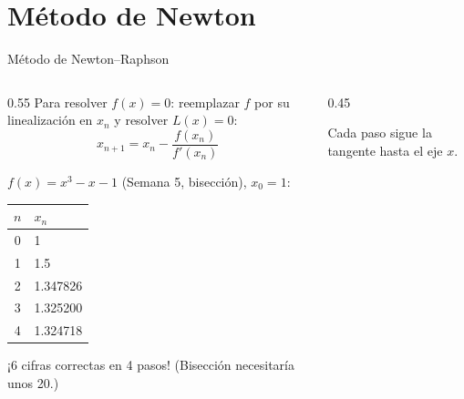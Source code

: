 \documentclass[10pt,aspectratio=169]{beamer}
\begin{document}
\section{Método de Newton}

\begin{frame}{Método de Newton--Raphson}
  \begin{columns}
    \begin{column}{0.55\textwidth}
      Para resolver $f(x)=0$: reemplazar $f$ por su linealización en $x_n$ y resolver $L(x)=0$:
      \[ \boxed{x_{n+1}=x_n-\frac{f(x_n)}{f'(x_n)}} \]
      \begin{ejemplo}[9]
        $f(x)=x^3-x-1$ (Semana 5, bisección), $x_0=1$:
        \begin{center}
          \small
          \begin{tabular}{c|l}
            $n$ & $x_n$\\ \hline
            0 & 1\\
            1 & 1.5\\
            2 & 1.347826\\
            3 & 1.325200\\
            4 & 1.324718
          \end{tabular}
        \end{center}
        ¡6 cifras correctas en 4 pasos! (Bisección necesitaría unos 20.)
      \end{ejemplo}
    \end{column}
    \begin{column}{0.45\textwidth}
      \centering

      \small Cada paso sigue la tangente hasta el eje $x$.
    \end{column}
  \end{columns}
\end{frame}
\end{document}
